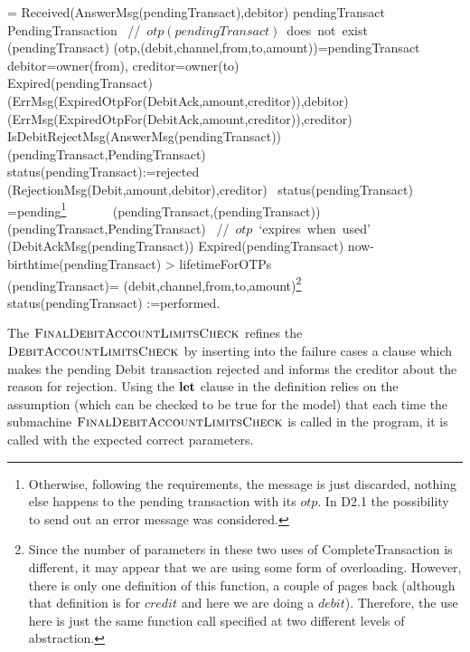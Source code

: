 \begin{asm}
 =\+          
\IF Received(AnswerMsg(pendingTransact),\FROM debitor) \THEN\+
   \IF pendingTransact  \not \in PendingTransaction \mbox{  //  $otp(pendingTransact)$ does not exist}\+
      \THEN ~ (pendingTransact)\-
      \ELSE \+
         \LET (otp,(debit,channel,from,to,amount))=pendingTransact \\
    \LET debitor=owner(from), creditor=owner(to)\\
            \IF Expired(pendingTransact) \THEN \+
     (ErrMsg(ExpiredOtpFor(DebitAck,amount,creditor)),\TO debitor) \\
     (ErrMsg(ExpiredOtpFor(DebitAck,amount,creditor)),\TO creditor)\-
     \ELSE ~\IF  
     IsDebitRejectMsg(AnswerMsg(pendingTransact)) \THEN \+
     (pendingTransact,PendingTransact)\\
     status(pendingTransact):=rejected\\
     (RejectionMsg(Debit,amount,debitor),\TO creditor)\-        
     \ELSE ~\IF status(pendingTransact)   =pending\footnote{Otherwise, following the requirements, the message is just discarded, nothing else happens to the pending transaction with its $otp$. In D2.1 the possibility to send out an error message was considered.} 
     \THEN \+
     \+
     ~~~~~~ (pendingTransact,(pendingTransact))\-
     (pendingTransact,PendingTransact)
     \mbox{  // $otp$ `expires when used'}\dec\dec\- 
     (DebitAckMsg(pendingTransact)) \-
     \WHERE \+
     Expired(pendingTransact) \IFF now-birthtime(pendingTransact) > lifetimeForOTPs\\
     (pendingTransact)=\+
     (debit,channel,from,to,amount)\footnote{Since the number of parameters in these two uses of CompleteTransaction is different, it may appear that we are using some form of overloading. However, there is only one definition of this function, a couple of pages back (although that definition is for $credit$ and here we are doing a $debit$). Therefore, the use here is just the same function call specified at two different levels of abstraction.}\\
     status(pendingTransact) :=performed.
\end{asm}

The $\hbox{\sc FinalDebitAccountLimitsCheck}$ refines the  $\hbox{\sc DebitAccountLimitsCheck}$ by inserting into the failure cases a clause which makes the pending Debit transaction rejected and informs the creditor about the reason for rejection. Using the $\mathrel{\mathbf{let}}$ clause in the definition relies on the assumption (which can be checked to be true for the model) that each time the submachine $\hbox{\sc FinalDebitAccountLimitsCheck}$ is called in the program, it is called with the expected correct parameters.

